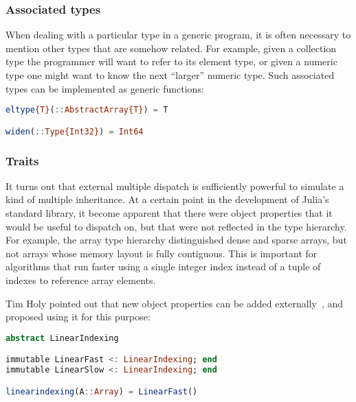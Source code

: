 

\subsubsection{Associated types}

When dealing with a particular type in a generic program, it is often
necessary to mention other types that are somehow related.
For example, given a collection type the programmer will want to
refer to its element type, or given a numeric type one might want to
know the next ``larger'' numeric type.
Such associated types can be implemented as generic functions:

\begin{singlespace}
\begin{lstlisting}[language=julia]
eltype{T}(::AbstractArray{T}) = T

widen(::Type{Int32}) = Int64
\end{lstlisting}
\end{singlespace}

\subsubsection{Traits}

It turns out that external multiple dispatch is sufficiently powerful
to simulate a kind of multiple inheritance.
At a certain point in the development of Julia's standard library,
it become apparent that there were object properties that it would be
useful to dispatch on, but that were not reflected in the type hierarchy.
For example, the array type hierarchy distinguished dense and sparse
arrays, but not arrays whose memory layout is fully contiguous.
This is important for algorithms that run faster using a single
integer index instead of a tuple of indexes to reference array elements.

Tim Holy pointed out that new object properties can be added
externally~\cite{timholytrait}, and proposed using it for this purpose:

\begin{singlespace}
\begin{lstlisting}[language=julia]
abstract LinearIndexing

immutable LinearFast <: LinearIndexing; end
immutable LinearSlow <: LinearIndexing; end

linearindexing(A::Array) = LinearFast()
\end{lstlisting}
\end{singlespace}

